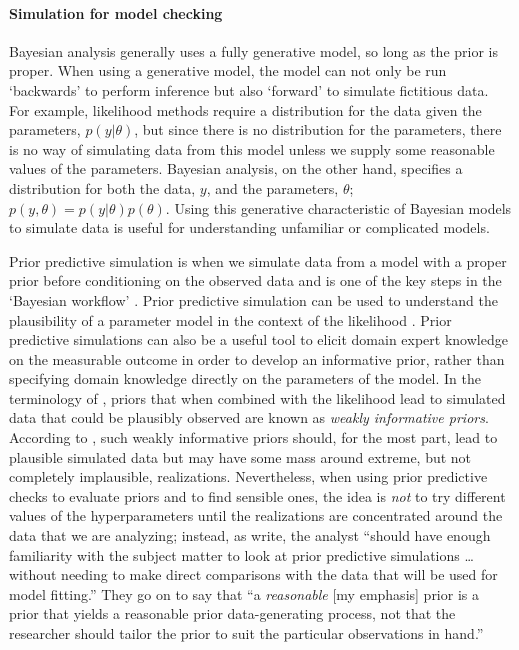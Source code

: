 \paragraph*{Simulation for model checking}

Bayesian analysis generally uses a fully generative model, so long as the prior is proper. When using a generative model, the model can not only be run `backwards' to perform inference but also `forward' to simulate fictitious data. For example, likelihood methods require a distribution for the data given the parameters, $p(y|\theta)$, but since there is no distribution for the parameters, there is no way of simulating data from this model unless we supply some reasonable values of the parameters. Bayesian analysis, on the other hand, specifies a distribution for both the data, $y$, and the parameters, $\theta$; $p(y, \theta) = p(y|\theta)p(\theta)$. Using this generative characteristic of Bayesian models to simulate data is useful for understanding unfamiliar or complicated models.

Prior predictive simulation is when we simulate data from a model with a proper prior before conditioning on the observed data and is one of the key steps in the `Bayesian workflow' \citep[Figure ~1]{gelman_workflow_2020}. Prior predictive simulation can be used to understand the plausibility of a parameter model in the context of the likelihood \citep{gelman_2017}. Prior predictive simulations can also be a useful tool to elicit domain expert knowledge on the measurable outcome in order to develop an informative prior, rather than specifying domain knowledge directly on the parameters of the model. In the terminology of \cite{gabry_vis_2019}, priors that when combined with the likelihood lead to simulated data that could be plausibly observed are known as \textit{weakly informative priors}. According to \cite{gabry_vis_2019}, such weakly informative priors should, for the most part, lead to plausible simulated data but may have some mass around extreme, but not completely implausible, realizations. Nevertheless, when using prior predictive checks to evaluate priors and to find sensible ones, the idea is \textit{not} to try different values of the hyperparameters until the realizations are concentrated around the data that we are analyzing; instead, as \cite{gabry_vis_2019a} write, the analyst ``should have enough familiarity with the subject matter to look at prior predictive simulations \ldots without needing to make direct comparisons with the data that will be used for model fitting.'' They go on to say that ``a \textit{reasonable} [my emphasis] prior is a prior that yields a reasonable prior data-generating process, not that the researcher should tailor the prior to suit the particular observations in hand.''

